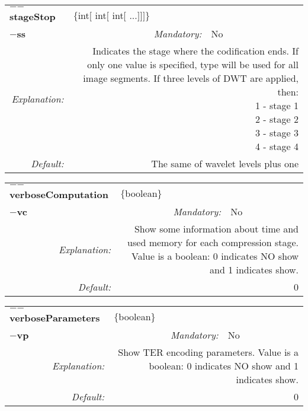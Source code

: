 \begin{center}\begin{tabular}{|rr|rlrl|}
\hline
\multicolumn{2}{|l|}{\textbf{$-$$-$stageStop}} & \multicolumn{4}{|l|}{$\{$int$[$ int$[$ int$[$ ...$]$$]$$]$$\}$} \\
\cline{3-6}
\multicolumn{2}{|l|}{\textbf{$-$ss}} & \emph{Mandatory:} & No & &  \\
\hline
\emph{Explanation:} & \multicolumn{5}{|p{12cm}|}{Indicates the stage where the codification ends.  If only one value is specified, type will be used for all image segments. If three levels of DWT are applied, then: \newline 1 - stage 1 \newline 2 - stage 2 \newline 3 - stage 3 \newline 4 - stage 4 } \\
\hline
\emph{Default:} & \multicolumn{5}{|p{12cm}|}{The same of wavelet levels plus one} \\
\hline
\end{tabular}\end{center}
\begin{center}\begin{tabular}{|rr|rlrl|}
\hline
\multicolumn{2}{|l|}{\textbf{$-$$-$verboseComputation}} & \multicolumn{4}{|l|}{$\{$boolean$\}$} \\
\cline{3-6}
\multicolumn{2}{|l|}{\textbf{$-$vc}} & \emph{Mandatory:} & No & &  \\
\hline
\emph{Explanation:} & \multicolumn{5}{|p{12cm}|}{Show some information about time and used memory for each compression stage. Value is a boolean: 0 indicates NO show and 1 indicates show.} \\
\hline
\emph{Default:} & \multicolumn{5}{|p{12cm}|}{0 } \\
\hline
\end{tabular}\end{center}
\begin{center}\begin{tabular}{|rr|rlrl|}
\hline
\multicolumn{2}{|l|}{\textbf{$-$$-$verboseParameters}} & \multicolumn{4}{|l|}{$\{$boolean$\}$} \\
\cline{3-6}
\multicolumn{2}{|l|}{\textbf{$-$vp}} & \emph{Mandatory:} & No & &  \\
\hline
\emph{Explanation:} & \multicolumn{5}{|p{12cm}|}{Show TER encoding parameters. Value is a boolean: 0 indicates NO show and 1 indicates show.} \\
\hline
\emph{Default:} & \multicolumn{5}{|p{12cm}|}{0 } \\
\hline
\end{tabular}\end{center}
